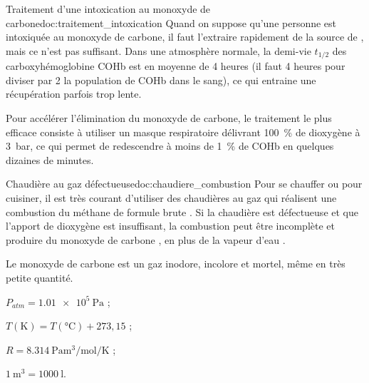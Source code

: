
\begin{doc}{Traitement d'une intoxication au monoxyde de carbone}{doc:traitement_intoxication}
  Quand on suppose qu'une personne est intoxiquée au monoxyde de carbone, il faut l'extraire rapidement de la source de , mais ce n'est pas suffisant.
  Dans une atmosphère normale, la demi-vie $t_{1/2}$ des carboxyhémoglobine COHb est en moyenne de 4 heures (il faut 4 heures pour diviser par 2 la population de COHb dans le sang), ce qui entraine une récupération parfois trop lente.
  
  Pour accélérer l'élimination du monoxyde de carbone, le traitement le plus efficace consiste à utiliser un masque respiratoire délivrant \qty{100}{\percent} de dioxygène à \qty{3}{\bar}, ce qui permet de redescendre à moins de \qty{1}{\percent} de COHb en quelques dizaines de minutes.
\end{doc}



\begin{doc}{Chaudière au gaz défectueuse}{doc:chaudiere_combustion}
  Pour se chauffer ou pour cuisiner, il est très courant d'utiliser des chaudières au gaz qui réalisent une combustion du méthane de formule brute .
  Si la chaudière est défectueuse et que l'apport de dioxygène est insuffisant, la combustion peut être incomplète et produire du monoxyde de carbone , en plus de la vapeur d'eau .

  Le monoxyde de carbone est un gaz inodore, incolore et mortel, même en très petite quantité.

  \begin{donnees}[2]
    \item $P_{atm} = \qty{1,01e5}{\pascal}$ ;
    \item $T (\unit{\kelvin}) = T(\unit{\degreeCelsius}) + 273,15$ ;
    \item $R = \qty{8.314}{\pascal\m\cubed\per\mol\per\kelvin}$ ;
    \item $\qty{1}{\m\cubed} = \qty{1000}{\litre}$.
  \end{donnees}
\end{doc}

